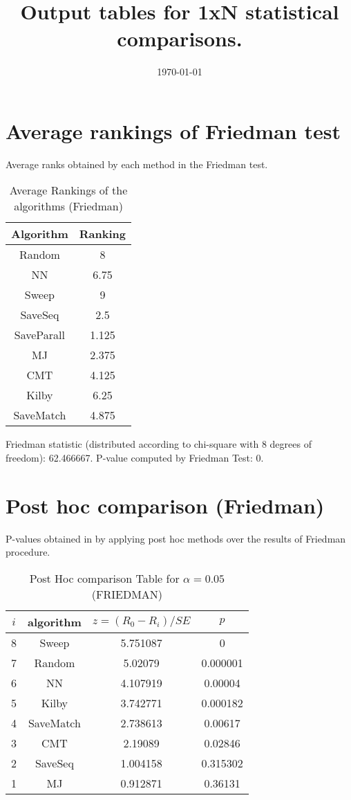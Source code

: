 \documentclass[a4paper,10pt]{article}
\title{Output tables for 1xN statistical comparisons.}
\author{}
\date{\today}
\begin{document}
\begin{landscape}
\pagestyle{empty}
\maketitle
\thispagestyle{empty}

\section{Average rankings of Friedman test}


Average ranks obtained by each method in the Friedman test.

\begin{table}[!htp]
\centering
\begin{tabular}{|c|c|}\hline
Algorithm&Ranking\\\hline
Random&8\\NN&6.75\\Sweep&9\\SaveSeq&2.5\\SaveParall&1.125\\MJ&2.375\\CMT&4.125\\Kilby&6.25\\SaveMatch&4.875\\\hline\end{tabular}
\caption{Average Rankings of the algorithms (Friedman)}
\end{table}

Friedman statistic (distributed according to chi-square with 8 degrees of freedom): 62.466667. \newline P-value computed by Friedman Test: 0.\newline


\newpage

\section{Post hoc comparison (Friedman)}


P-values obtained in by applying post hoc methods over the results of Friedman procedure.

\begin{table}[!htp]
\centering\footnotesize
\begin{tabular}{cccc}
$i$&algorithm&$z=(R_0 - R_i)/SE$&$p$\\
\hline8&Sweep&5.751087&0\\7&Random&5.02079&0.000001\\6&NN&4.107919&0.00004\\5&Kilby&3.742771&0.000182\\4&SaveMatch&2.738613&0.00617\\3&CMT&2.19089&0.02846\\2&SaveSeq&1.004158&0.315302\\1&MJ&0.912871&0.36131\\\hline
\end{tabular}
\caption{Post Hoc comparison Table for $\alpha=0.05$ (FRIEDMAN)}
\end{table}
\newpage


\end{landscape}
\end{document}
